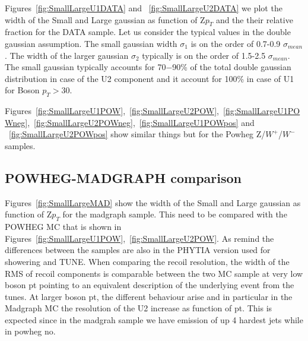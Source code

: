 \documentclass[41pt,a4paper,oneside]{report}
\begin{document}
 
Figures~\ref{fig:SmallLargeU1DATA} and ~\ref{fig:SmallLargeU2DATA} we plot the width of the Small and Large gaussian as function of Z$p_{T}$ and the their relative fraction for the DATA sample.
Let us consider the typical values in the double gaussian assumption. The small gaussian width $\sigma_{1}$ is on the order of 0.7-0.9 $\sigma_{mean}$. 
The width of the larger gaussian $\sigma_{2}$ typically is on the order of 1.5-2.5 $\sigma_{mean}$.
The small gaussian typically accounts for 70−90\% of the total double gaussian distribution in case of the U2 component and it account for 100\% in case of U1 for Boson $p_{T} >30$.

Figures~\ref{fig:SmallLargeU1POW},~\ref{fig:SmallLargeU2POW},~\ref{fig:SmallLargeU1POWneg},~\ref{fig:SmallLargeU2POWneg},~\ref{fig:SmallLargeU1POWpos} and ~\ref{fig:SmallLargeU2POWpos} show similar things but for the Powheg Z/$W^{+}$/$W^{-}$ samples.

{\color{magenta}{Need to possibly constraint the sign of the DATA parameters with the parameters determined from the fit to MC.}}

\subsection{POWHEG-MADGRAPH comparison}
\label{sec:MadComp}

Figures~\ref{fig:SmallLargeMAD} show the width of the Small and Large gaussian as function of Z$p_{T}$  for the madgraph sample.
This need to be compared with the POWHEG MC that is shown in Figures~\ref{fig:SmallLargeU1POW},~\ref{fig:SmallLargeU2POW}.
As remind the differences between the samples are also in the PHYTIA version used for showering and TUNE.
When comparing the recoil resolution, the width of the RMS of recoil components is comparable between the two MC sample at very low boson pt pointing to an equivalent description of the underlying event from the tunes. At larger boson pt, the different behaviour arise and in particular in the Madgraph MC the resolution of the U2 increase as function of pt.
This is expected since in the madgrah sample we have emission of up 4 hardest jets while in powheg no.
\end{document}
